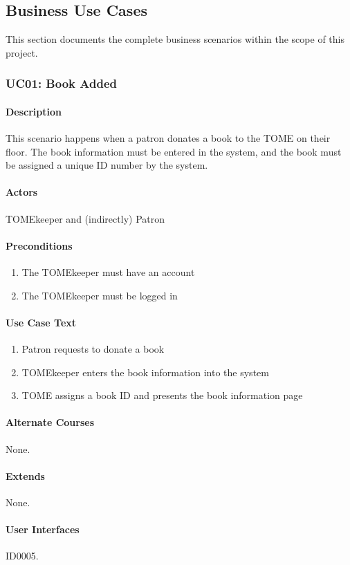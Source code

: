 \documentclass[12pt,titlepage]{article}
\begin{document}
\subsection{Business Use Cases}
This section documents the complete business scenarios within the scope of this project.


\subsubsection{UC01: Book Added}
\paragraph{Description}
This scenario happens when a patron donates a book to the TOME on their floor.  The book information must be entered in the system, and the book must be assigned a unique ID number by the system.
\paragraph{Actors}
TOMEkeeper and (indirectly) Patron
\paragraph{Preconditions}
\begin{enumerate}
	\item The TOMEkeeper must have an account
	\item The TOMEkeeper must be logged in
\end{enumerate}
\paragraph{Use Case Text}
\begin{enumerate}
	\item Patron requests to donate a book
	\item TOMEkeeper enters the book information into the system
	\item TOME assigns a book ID and presents the book information page
\end{enumerate}
\paragraph{Alternate Courses}
None.
\paragraph{Extends}
None.
\paragraph{User Interfaces}
ID0005.
\end{document}
